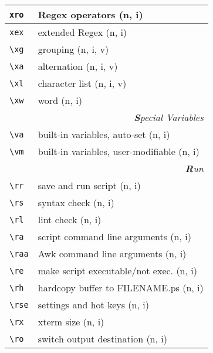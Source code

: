 \documentclass[oneside,10pt,landscape,DIV16]{scrartcl}
\begin{document}
\begin{multicols}{3}
\begin{center}
\begin{tabular}[]{|p{11mm}|p{62mm}|}
\hline     \verb'xro' &  Regex operators               \hfill (n, i)\\ 
\hline     \verb'xex' &  extended Regex                \hfill (n, i)\\ 
\hline     \verb'\xg' &  grouping                      \hfill (n, i, v)   \\
\hline     \verb'\xa' &  alternation                   \hfill (n, i, v)   \\
\hline     \verb'\xl' &  character list                \hfill (n, i, v)   \\
\hline     \verb'\xw' &  word                          \hfill (n, i)   \\
\hline
\hline
\multicolumn{2}{|r|}{\textsl{\textbf{S}pecial Variables}}            \\[1.0ex]
\hline \verb'\va'   & built-in variables, auto-set        \hfill (n, i)\\
\hline \verb'\vm'   & built-in variables, user-modifiable \hfill (n, i)\\
\hline
\hline
\multicolumn{2}{|r|}{\textsl{\textbf{R}un}} \\[1.0ex]
\hline \verb'\rr '  & save and run script                 \hfill (n, i)   \\
\hline \verb'\rs '  & syntax check                        \hfill (n, i)   \\
\hline \verb'\rl '  & lint check                          \hfill (n, i)   \\
\hline \verb'\ra '  & script command line arguments       \hfill (n, i)   \\
\hline \verb'\raa'  & Awk command line arguments          \hfill (n, i)   \\
\hline \verb'\re'   & make script executable/not exec.    \hfill (n, i)   \\
\hline \verb'\rh '  & hardcopy buffer to FILENAME.ps      \hfill (n, i)   \\
\hline \verb'\rse'  & settings and hot keys               \hfill (n, i)   \\
\hline \verb'\rx '  & xterm size                          \hfill (n, i)   \\
\hline \verb'\ro '  & switch output destination           \hfill (n, i)   \\

\end{tabular}
\end{center}
\end{multicols}
\end{document}
